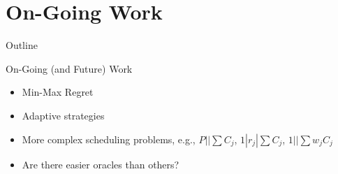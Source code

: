\documentclass[aspectratio=169]{beamer}
\begin{document}
\section{On-Going Work}

\begin{frame}{Outline}
\end{frame}


\begin{frame}{On-Going (and Future) Work}

\begin{itemize}
    \item Min-Max Regret
    \item Adaptive strategies
    \item More complex scheduling problems, e.g., \(P||\sum C_j\), \(1|r_j|\sum C_j\), \(1||\sum w_jC_j\)
    \item Are there easier oracles than others?
\end{itemize}

\end{frame}
\end{document}
